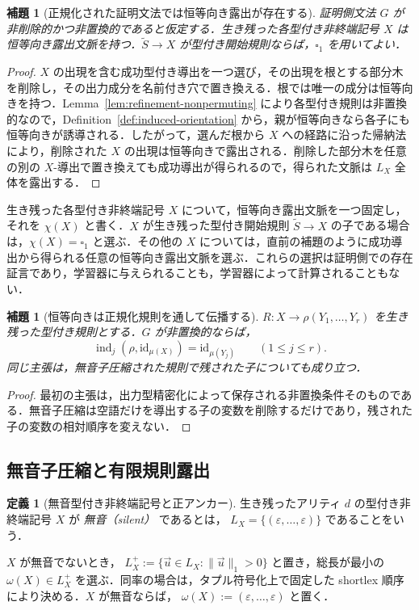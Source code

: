 \documentclass[11pt,a4paper]{ltjsarticle}
\numberwithin{equation}{section}
\theoremstyle{plain}
\newtheorem{lemma}[theorem]{補題}
\theoremstyle{definition}
\newtheorem{definition}[theorem]{定義}
\theoremstyle{remark}
\newcommand{\tuple}[1]{\vec{#1}}
\newcommand{\blank}{\square}
\newcommand{\eps}{\varepsilon}
\begin{document}
\begin{lemma}[正規化された証明文法では恒等向き露出が存在する]
\label{lem:identity-exposing-contexts}
証明側文法 \(G\) が非削除的かつ非置換的であると仮定する．生き残った各型付き非終端記号 \(X\) は恒等向き露出文脈を持つ．\(\widetilde S\to X\) が型付き開始規則ならば，\(\blank_1\) を用いてよい．
\end{lemma}

\begin{proof}
\(X\) の出現を含む成功型付き導出を一つ選び，その出現を根とする部分木を削除し，その出力成分を名前付き穴で置き換える．根では唯一の成分は恒等向きを持つ．Lemma~\ref{lem:refinement-nonpermuting} により各型付き規則は非置換的なので，Definition~\ref{def:induced-orientation} から，親が恒等向きなら各子にも恒等向きが誘導される．したがって，選んだ根から \(X\) への経路に沿った帰納法により，削除された \(X\) の出現は恒等向きで露出される．削除した部分木を任意の別の \(X\)-導出で置き換えても成功導出が得られるので，得られた文脈は \(L_X\) 全体を露出する．
\end{proof}

生き残った各型付き非終端記号 \(X\) について，恒等向き露出文脈を一つ固定し，それを \(\chi(X)\) と書く．\(X\) が生き残った型付き開始規則 \(\widetilde S\to X\) の子である場合は，\(\chi(X)=\blank_1\) と選ぶ．その他の \(X\) については，直前の補題のように成功導出から得られる任意の恒等向き露出文脈を選ぶ．これらの選択は証明側での存在証言であり，学習器に与えられることも，学習器によって計算されることもない．

\begin{lemma}[恒等向きは正規化規則を通して伝播する]
\label{lem:identity-orientation-propagation}
\(R:X\to\rho(Y_1,\ldots,Y_r)\) を生き残った型付き規則とする．\(G\) が非置換的ならば，
\[
  \operatorname{ind}_j(\rho,\mathrm{id}_{\mu(X)})
  =\mathrm{id}_{\mu(Y_j)}
  \qquad(1\le j\le r).
\]
同じ主張は，無音子圧縮された規則で残された子についても成り立つ．
\end{lemma}

\begin{proof}
最初の主張は，出力型精密化によって保存される非置換条件そのものである．無音子圧縮は空語だけを導出する子の変数を削除するだけであり，残された子の変数の相対順序を変えない．
\end{proof}
\subsection{無音子圧縮と有限規則露出}

\begin{definition}[無音型付き非終端記号と正アンカー]
\label{def:silent-typed}
生き残ったアリティ \(d\) の型付き非終端記号 \(X\) が \emph{無音（silent）} であるとは，
\(L_X=\{(\eps,\ldots,\eps)\}\)
であることをいう．

\(X\) が無音でないとき，
\(L_X^+:=\{\tuple u\in L_X:\|\tuple u\|_1>0\}\)
と置き，総長が最小の \(\omega(X)\in L_X^+\) を選ぶ．同率の場合は，タプル符号化上で固定した shortlex 順序により決める．\(X\) が無音ならば，
\(\omega(X):=(\eps,\ldots,\eps)\)
と置く．
\end{definition}
\end{document}
